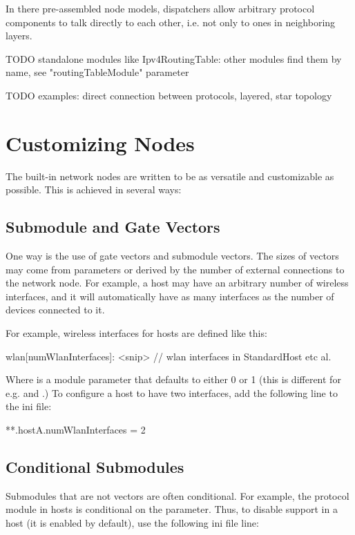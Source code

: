 In there pre-assembled node models, dispatchers allow arbitrary
protocol components to talk directly to each other, i.e. not only
to ones in neighboring layers.

TODO standalone modules like Ipv4RoutingTable: other modules find them by name, 
see "routingTableModule" parameter

TODO examples: direct connection between protocols, layered, star topology

\section{Customizing Nodes}

The built-in network nodes are written to be as versatile and customizable
as possible. This is achieved in several ways:

\subsection*{Submodule and Gate Vectors}

One way is the use of gate vectors and submodule vectors. The sizes 
of vectors may come from parameters or derived by the number of
external connections to the network node. For example, a host may
have an arbitrary number of wireless interfaces, and it will automatically
have as many  interfaces as the number of  
devices connected to it.

For example, wireless interfaces for hosts are defined like this:

\begin{ned}
wlan[numWlanInterfaces]: <snip> // wlan interfaces in StandardHost etc al.
\end{ned}

Where  is a module parameter that defaults to 
either 0 or 1 (this is different for e.g.  and
.) To configure a host to have two interfaces, 
add the following line to the ini file: 

\begin{inifile}
**.hostA.numWlanInterfaces = 2
\end{inifile}

\subsection*{Conditional Submodules}

Submodules that are not vectors are often conditional. For example,
the  protocol module in hosts is conditional on
the  parameter. Thus, to disable  support
in a host (it is enabled by default), use the following ini file line:

